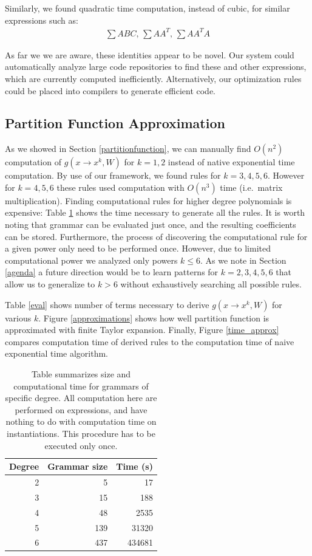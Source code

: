 Similarly, we found quadratic time computation, instead of cubic, for
similar expressions such as: 
\begin{align*}
	\sum ABC\text{, }\sum AA^T\text{, }\sum AA^TA
\end{align*}

As far we we are aware, these identities appear to be novel. Our
system could automatically analyze large code repositories to find
these and other expressions, which are currently computed
inefficiently. Alternatively, our optimization rules could be placed
into compilers to generate efficient code.

\subsection{Partition Function Approximation}

As we showed in Section \ref{partitionfunction}, we can manually find
$O(n^2)$ computation of $g(x \rightarrow x^k, W)$ for $k = 1, 2$
instead of native exponential time computation. By use of our
framework, we found rules for $k = 3, 4, 5, 6$. However for $k = 4, 5, 6$
these rules used computation with $O(n^3)$ time (i.e.~matrix
multiplication).  Finding computational rules for higher degree
polynomials is expensive: Table \ref{grammars} shows the time
necessary to generate all the rules. It is worth noting that grammar
can be evaluated just once, and the resulting coefficients can be
stored. Furthermore, the process of discovering the computational rule
for a given power only need to be performed once. However, due to limited computational
power we analyzed only powers $k \leq 6$. As we note in Section
\ref{agenda} a future direction would be to learn patterns for
$k=2, 3, 4, 5, 6$ that allow us to generalize to $k>6$ without exhaustively
searching all possible rules. 

Table \ref{eval} shows number of terms necessary to derive $g(x
\rightarrow x^k, W)$ for various $k$. Figure \ref{approximations} shows
how well partition function is approximated with finite Taylor
expansion. Finally, Figure \ref{time_approx} compares computation time
of derived rules to the computation time of naive exponential time
algorithm.

\begin{table}
\tiny
\centering
\begin{tabular}{rrr}
\hline
Degree & Grammar size & Time (s) \\
\hline
2 & 5 & 17 \\
3 & 15 & 188 \\
4 & 48 & 2535\\
5 & 139 & 31320 \\
6 & 437 & 434681 \\
\hline
\end{tabular}
\caption{Table summarizes size and computational time for grammars of specific degree. 
All computation here are performed on expressions, and have nothing to do with computation time on instantiations.
This procedure has to be executed only once.}
\label{grammars}
\end{table}

